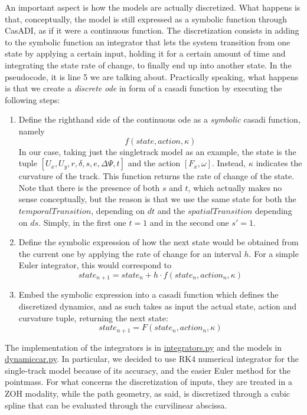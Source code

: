 \documentclass[a4paper, onecolumn, 11pt]{article}
\begin{document}
An important aspect is how the models are actually discretized.  What happens is
that, conceptually, the model is still expressed as a symbolic function through
CasADI, as if it were a continuous function. The discretization consists in
adding to the symbolic function an integrator that lets the system transition
from one state by applying a certain input, holding it for a certain amount of
time and integrating the state rate of change, to finally end up into another
state. In the pseudocode, it is line 5 we are talking about. Practically
speaking, what happens is that we create a \textit{discrete ode} in form of a
casadi function by executing the following steps:
\begin{enumerate}
    \item Define the righthand side of the continuous ode as a \textit{symbolic}
    casadi function, namely \[f(state,action,\kappa)\] In our case, taking just
    the singletrack model as an example, the state is the tuple
    \([U_x,U_y,r,\delta,s,e,\Delta\varPsi,t]\) and the action \([F_x,\omega]\).
    Instead, $\kappa$ indicates the curvature of the track. This function
    returns the rate of change of the state. Note that there is the presence of
    both $s$ and $t$, which actually makes no sense conceptually, but the reason
    is that we use the same state for both the $temporalTransition$, depending
    on $dt$ and the $spatialTransition$ depending on $ds$. Simply, in the first
    one $\dot t=1$ and in the second one $s'=1$.
    \item Define the symbolic expression of how the next state would be obtained
    from the current one by applying the rate of change for an interval $h$. For a
    simple Euler integrator, this would correspond to \[state_{n+1}=state_n+h \cdot f(state_n,action_n,\kappa)\]
    \item Embed the symbolic expression into a casadi function which defines the
    discretized dynamics, and as such takes as input the actual state, action
    and curvature tuple, returning the next state: \[state_{n+1}=F(state_n,action_n,\kappa)\]
\end{enumerate}

The implementation of the integrators is in
\href{https://github.com/neverorfrog/vehicle-control/blob/main/utils/integrators.py}{integrators.py}
and the models in
\href{https://github.com/neverorfrog/vehicle-control/blob/main/models/dynamic_car.py}{dynamiccar.py}.
In particular, we decided to use RK4 numerical integrator for the single-track
model because of its accuracy, and the easier Euler method for the pointmass.
For what concerns the discretization of inputs, they are treated in a ZOH
modality, while the path geometry, as said, is discretized through a cubic
spline that can be evaluated through the curvilinear abscissa.
\end{document}

